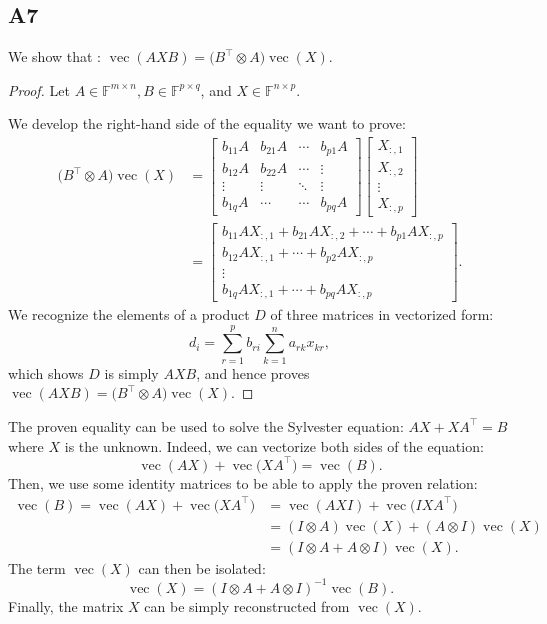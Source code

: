 \documentclass[11pt]{article}
\DeclareMathOperator{\vect}{vec}
\newcommand{\field}{\mathbb{F}} %
\newcommand{\kp}{\otimes} %
\begin{document}
\subsection*{A7}
We show that : $\vect(AXB)=\big(B^\top\kp A\big)\vect(X)$.
\begin{proof}
Let \(A \in \field^{m\times n}, B \in \field^{p\times q}\), and \(X \in \field^{n\times p}\).

We develop the right-hand side of the equality we want to prove:
\begin{align*}
    \big(B^\top\kp A\big)\vect(X) &=
    \begin{bmatrix}
    b_{11}A & b_{21}A & \cdots & b_{p1}A\\
    b_{12}A & b_{22}A & \cdots & \vdots \\
    \vdots & \vdots & \ddots & \vdots \\
    b_{1q}A & \cdots & \cdots & b_{pq}A
    \end{bmatrix}
    \begin{bmatrix}
    X_{:,1}\\
    X_{:,2}\\
    \vdots\\
    X_{:,p}
    \end{bmatrix}\\
    &=
    \begin{bmatrix}
    b_{11}AX_{:,1} + b_{21}AX_{:,2} + \cdots + b_{p1}AX_{:,p}\\
    b_{12}AX_{:,1} + \cdots + b_{p2}AX_{:,p}\\
    \vdots \\
    b_{1q}AX_{:,1} + \cdots + b_{pq}AX_{:,p}
    \end{bmatrix}.
\end{align*}
We recognize the elements of a product \(D\) of three matrices in vectorized form:
\[
    d_i=\sum^{p}_{r=1}b_{ri}\sum^{n}_{k=1}a_{rk}x_{kr},
\]
which shows \(D\) is simply \(AXB\), and hence proves \(\vect(AXB)=\big(B^\top\kp A\big)\vect(X)\).
\end{proof}

The proven equality can be used to solve the Sylvester equation: $AX+XA^\top=B$ where $X$ is the unknown.
Indeed, we can vectorize both sides of the equation:
\[
    \vect(AX) + \vect\big(XA^\top\big)=\vect(B).
\]
Then, we use some identity matrices to be able to apply the proven relation:
\begin{align*}
    \vect(B) = \vect(AX) + \vect\big(XA^\top\big) &= \vect(AXI) + \vect\big(IXA^\top\big)\\
    &=(I\kp A)\vect(X) + (A\kp I) \vect(X)\\
    &=(I\kp A + A\kp I) \vect(X).
\end{align*}
The term $\vect(X)$ can then be isolated:
\[
    \vect(X)=(I\kp A + A\kp I)^{-1}\vect(B).
\]
Finally, the matrix \(X\) can be simply reconstructed from $\vect(X)$.
\end{document}

